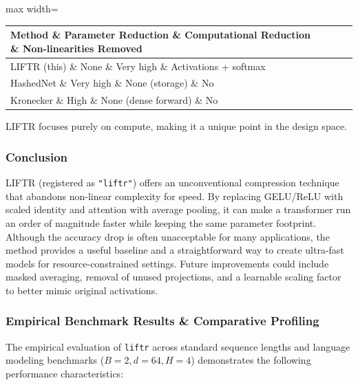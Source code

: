 \begin{center}
\begin{adjustbox}{max width=\columnwidth}
\renewcommand{\arraystretch}{1.2}
\begin{tabular}{llll}
\toprule
Method \& Parameter Reduction \& Computational Reduction \& Non-linearities Removed \\
\midrule
LIFTR (this) \& None \& Very high \& Activations + softmax \\
HashedNet \& Very high \& None (storage) \& No \\
Kronecker \& High \& None (dense forward) \& No \\

\bottomrule
\end{tabular}
\end{adjustbox}
\end{center}
LIFTR focuses purely on compute, making it a unique point in the design space.


\subsubsection*{Conclusion}

LIFTR (registered as \texttt{"liftr"}) offers an unconventional compression technique that abandons non-linear complexity for speed. By replacing GELU/ReLU with scaled identity and attention with average pooling, it can make a transformer run an order of magnitude faster while keeping the same parameter footprint. Although the accuracy drop is often unacceptable for many applications, the method provides a useful baseline and a straightforward way to create ultra-fast models for resource-constrained settings. Future improvements could include masked averaging, removal of unused projections, and a learnable scaling factor to better mimic original activations.

\subsubsection*{Empirical Benchmark Results \& Comparative Profiling}

The empirical evaluation of \texttt{liftr} across standard sequence lengths and language modeling benchmarks ($B=2, d=64, H=4$) demonstrates the following performance characteristics:


